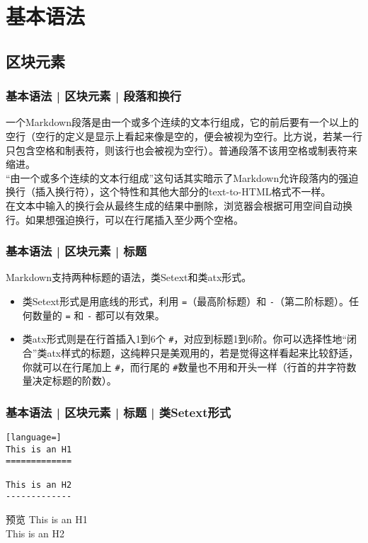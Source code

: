 \section{基本语法}
\subsection{区块元素}
\begin{frame}
  \frametitle{基本语法 | 区块元素 | 段落和换行}
一个Markdown段落是由一个或多个连续的文本行组成，它的\alert{前后要有一个以上的空行}（空行的定义是显示上看起来像是空的，便会被视为空行。比方说，若某一行只包含空格和制表符，则该行也会被视为空行）。普通段落不该用空格或制表符来缩进。\\
  \vspace{1em}
“由一个或多个连续的文本行组成”这句话其实暗示了Markdown允许段落内的强迫换行（插入换行符），这个特性和其他大部分的text-to-HTML格式不一样。\\
  \vspace{1em}
在文本中输入的换行会从最终生成的结果中删除，浏览器会根据可用空间自动换行。如果想\alert{强迫换行}，可以在行尾插入至少两个空格。
\end{frame}

\begin{frame}[fragile]
  \frametitle{基本语法 | 区块元素 | 标题}
  Markdown支持两种标题的语法，类Setext和类atx形式。
  \begin{itemize}
    \item 类Setext形式是用底线的形式，利用 \verb|=|（最高阶标题）和 \verb|-|（第二阶标题）。任何数量的 \verb|=| 和 \verb|-| 都可以有效果。
    \item 类atx形式则是在行首插入1到6个 \verb|#|，对应到标题1到6阶。你可以选择性地“闭合”类atx样式的标题，这纯粹只是美观用的，若是觉得这样看起来比较舒适，你就可以在行尾加上 \verb|#|，而行尾的 \verb|#|数量也不用和开头一样（行首的井字符数量决定标题的阶数）。
  \end{itemize}
\end{frame}

\begin{frame}[fragile]
  \frametitle{基本语法 | 区块元素 | 标题 | 类Setext形式}
\begin{lstlisting}[language=]
This is an H1
=============

This is an H2
-------------
\end{lstlisting}
\pause
\begin{block}{预览}
{\LARGE This is an H1}\\
{\Large This is an H2}
\end{block}
\end{frame}


